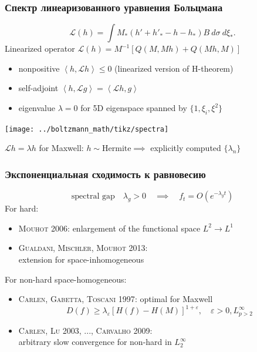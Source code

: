 \documentclass[mathserif]{beamer} %
\newcommand{\dd}{\:d}%
\newcommand{\dxi}{\dd\xi}
\newcommand{\OO}[1]{O(#1)}
\newcommand{\Cite}[2][]{\alert{\textsc{#2 #1}}}
\newcommand{\inner}[2]{\left\langle{#1},{#2}\right\rangle}
\renewcommand{\epsilon}{\varepsilon}
\begin{document}
\begin{frame}
    \frametitle{Спектр линеаризованного уравнения Больцмана}
    \begin{equation*}
        \mathcal{L}(h) = \int M_*(h'+h'_*-h-h_*) B
        \dd\sigma \dxi_*.
    \end{equation*}
    Linearized operator \(\mathcal{L}(h)=M^{-1}[Q(M,Mh)+Q(Mh,M)]\)
    \begin{itemize}
        \item nonpositive \(\inner{h}{\mathcal{L}h} \leq 0\) (linearized version of H-theorem)
        \item self-adjoint \(\inner{h}{\mathcal{L}g} = \inner{\mathcal{L}h}{g}\)
        \item eigenvalue \(\lambda=0\) for 5D eigenspace spanned by \(\{1,\xi_i,\xi^2\}\)
    \end{itemize}
    \hspace*{-30pt}\texttt{[image: ../boltzmann\_math/tikz/spectra]}

    \(\mathcal{L}h=\lambda h\) for Maxwell: \(h\sim\text{Hermite} \implies\) explicitly computed \(\{\lambda_n\}\)
\end{frame}

\begin{frame}
    \frametitle{Экспоненциальная сходимость к равновесию}
    \[ \text{spectral gap}\quad\lambda_g>0\quad\implies\quad f_t=\OO{e^{-\lambda_g t}} \]
    For hard: %
    \begin{itemize}
        \item \Cite[2006]{Mouhot}: enlargement of the functional space \(L^2\to L^1\)
        \item \Cite[2013]{Gualdani, Mischler, Mouhot}:\\ extension for space-inhomogeneous
    \end{itemize}
    For non-hard space-homogeneous:
    \begin{itemize}
        \item \Cite[1997]{Carlen, Gabetta, Toscani}: optimal for Maxwell
        \[ D(f) \geq \lambda_\epsilon \left[ H(f) - H(M) \right]^{1+\epsilon}, \quad \epsilon > 0, L^\infty_{p>2} \]
        \item \Cite[2003]{Carlen, Lu}, \Cite[2009]{..., Carvalho}: \\
            arbitrary slow convergence for non-hard in \(L^\infty_2\)
    \end{itemize}
\end{frame}
\end{document}
